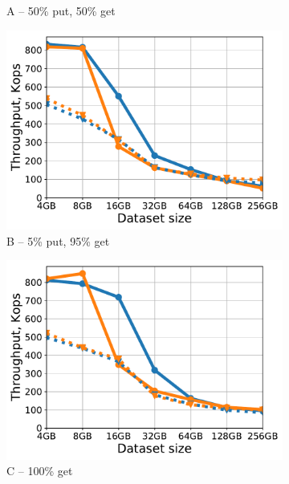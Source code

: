 \begin{figure}[tb]
\begin{subfigure}{0.32\linewidth}
\caption{A -- 50\% put, 50\% get}
\label{fig:throughput:a}
\end{subfigure}
\begin{subfigure}{0.32\linewidth}
\includegraphics[width=\textwidth]{figs/Workload_B_line.pdf}
\caption{B -- 5\% put, 95\% get}
\label{fig:throughput:b}
\end{subfigure}
\begin{subfigure}{0.32\linewidth}
\includegraphics[width=\textwidth]{figs/Workload_C_line.pdf}
\caption{C -- 100\% get}
\label{fig:throughput:c}
\end{subfigure}
\begin{subfigure}{0.32\linewidth}

\end{subfigure}
\end{figure}
